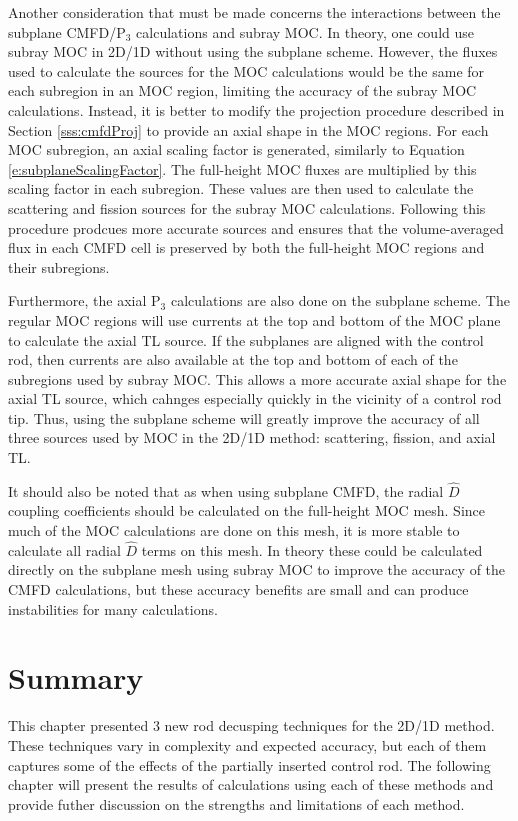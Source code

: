 Another consideration that must be made concerns the interactions between the subplane CMFD/P$_3$ calculations and subray MOC.  In theory, one could use subray MOC in 2D/1D without using the subplane scheme.  However, the fluxes used to calculate the sources for the MOC calculations would be the same for each subregion in an MOC region, limiting the accuracy of the subray MOC calculations.  Instead, it is better to modify the projection procedure described in Section \ref{sss:cmfdProj} to provide an axial shape in the MOC regions.  For each MOC subregion, an axial scaling factor is generated, similarly to Equation \ref{e:subplaneScalingFactor}.  The full-height MOC fluxes are multiplied by this scaling factor in each subregion.  These values are then used to calculate the scattering and fission sources for the subray MOC calculations.  Following this procedure prodcues more accurate sources and ensures that the volume-averaged flux in each CMFD cell is preserved by both the full-height MOC regions and their subregions.

Furthermore, the axial P$_3$ calculations are also done on the subplane scheme.  The regular MOC regions will use currents at the top and bottom of the MOC plane to calculate the axial TL source.  If the subplanes are aligned with the control rod, then currents are also available at the top and bottom of each of the subregions used by subray MOC.  This allows a more accurate axial shape for the axial TL source, which cahnges especially quickly in the vicinity of a control rod tip.  Thus, using the subplane scheme will greatly improve the accuracy of all three sources used by MOC in the 2D/1D method: scattering, fission, and axial TL.

It should also be noted that as when using subplane CMFD, the radial $\hat{D}$ coupling coefficients should be calculated on the full-height MOC mesh.  Since much of the MOC calculations are done on this mesh, it is more stable to calculate all radial $\hat{D}$ terms on this mesh.  In theory these could be calculated directly on the subplane mesh using subray MOC to improve the accuracy of the CMFD calculations, but these accuracy benefits are small and can produce instabilities for many calculations.

\section{Summary}

This chapter presented 3 new rod decusping techniques for the 2D/1D method.  These techniques vary in complexity and expected accuracy, but each of them captures some of the effects of the partially inserted control rod.  The following chapter will present the results of calculations using each of these methods and provide futher discussion on the strengths and limitations of each method.